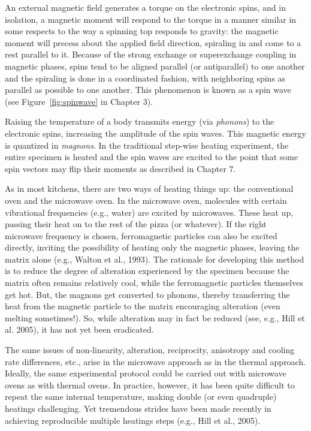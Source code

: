    An external magnetic field generates a torque on the electronic spins, and in isolation, a magnetic moment will respond to the torque in a manner similar in some respects to  the way a spinning top responds to gravity: the magnetic moment will precess about the applied field direction, spiraling in  and come to a rest parallel to it. Because of the strong exchange or superexchange coupling  in magnetic phases, spins tend to be aligned parallel (or antiparallel) to one another and the spiraling is done in a coordinated fashion, with neighboring spins as parallel as possible to one another.  This phenomenon is known as a 
 spin wave  (see Figure~\ref{fig:spinwave} in Chapter 3).  
 
 Raising the temperature of a body transmits energy (via {\it phonons})  to the electronic spins, increasing the amplitude of the spin waves.   This  magnetic energy is quantized in {\it magnons}.    In the traditional step-wise heating experiment, the entire specimen is heated and the spin waves are excited to the point that some spin vectors may flip their moments as described in  Chapter  7. 
 
  
 As in most kitchens, there are two ways of heating things up: the conventional oven and the microwave oven.  In the microwave oven, molecules with certain vibrational frequencies (e.g., water) are excited by 
 microwaves.  These heat up, passing their heat on  to the rest of the pizza (or whatever).  If the right microwave frequency is chosen, ferromagnetic particles can also be excited directly, inviting the possibility of heating only the magnetic phases, leaving the matrix alone (e.g., 
 Walton et al., 1993).  \nocite{walton93} The rationale for developing this method is to reduce the degree of alteration experienced by the specimen  because the matrix often remains relatively cool, while the ferromagnetic particles themselves get hot.  But, the magnons get converted to phonons, thereby transferring the heat from the magnetic particle to the matrix encouraging alteration (even melting sometimes!).  So, while alteration may in fact be reduced (see, e.g., 
 Hill et al. 2005), it has not yet been eradicated.  \nocite{hill05}
 
The same issues of non-linearity, alteration,  reciprocity, anisotropy and cooling rate differences, etc.,  arise in the microwave approach as in the thermal approach.  Ideally, the same experimental protocol could be carried out with microwave ovens as with thermal ovens.  In practice, however, it has been quite difficult to repeat the same internal temperature,  making double (or even quadruple) heatings challenging.  Yet tremendous strides have been made recently in achieving reproducible multiple heatings steps (e.g., 
 Hill et al., 2005).  \nocite{hill05}

